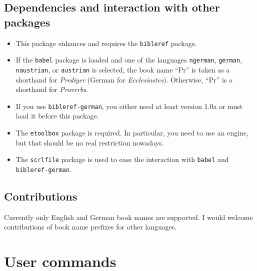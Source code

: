 \documentclass[DIV12,BCOR0mm]{scrartcl}
\newcommand{\ger}[1]{\foreignlanguage{ngerman}{#1}}
\begin{document}

\subsection{Dependencies and interaction with other packages}

\begin{itemize}
 \item This package enhances and requires the \texttt{bibleref} package.
 \item If the \texttt{babel} package is loaded and one of the languages
  \texttt{ngerman}, \texttt{german}, \texttt{naustrian}, or \texttt{austrian} is
  selected, the book name \enquote{Pr} is taken as a shorthand for
  \emph{\ger{Prediger}} (German for \emph{Ecclesiastes}). Otherwise, \enquote{Pr} is a
  shorthand for \emph{Proverbs}.
 \item If you use \texttt{bibleref-german}, you either need at least version 1.0a or
  must load it before this package.
 \item The \texttt{etoolbox} package is required. In particular, you need to use
  an \eTeX{} engine, but that should be no real restriction nowadays.
 \item The \texttt{scrlfile} package is used to ease the interaction with
  \texttt{babel} and \texttt{bibleref-german}.
\end{itemize}

\subsection{Contributions}
Currently only English and German book names are supported. I would welcome
contributions of book name prefixes for other languages.


\section{User commands}
\end{document}
